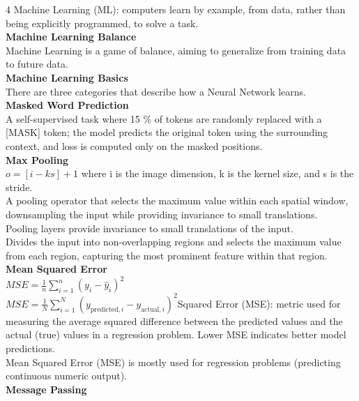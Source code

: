 \documentclass[8pt]{extarticle}
\begin{document}
\begin{multicols}{4}
Machine Learning (ML): computers learn by example, from data, rather than being explicitly programmed, to solve a task.\\
\vspace{2pt}\textbf{Machine Learning Balance}\\
Machine Learning is a game of balance, aiming to generalize from training data to future data.\\
\vspace{2pt}\textbf{Machine Learning Basics}\\
There are three categories that describe how a Neural Network learns.\\
\vspace{2pt}\textbf{Masked Word Prediction}\\
A self-supervised task where 15 \% of tokens are randomly replaced with a [MASK] token; the model predicts the original token using the surrounding context, and loss is computed only on the masked positions.\\
\vspace{2pt}\textbf{Max Pooling}\\
$o = \left[ i - k s \right] + 1$ where i is the image dimension, k is the kernel size, and s is the stride.\\
A pooling operator that selects the maximum value within each spatial window, downsampling the input while providing invariance to small translations.\\
Pooling layers provide invariance to small translations of the input.\\
Divides the input into non-overlapping regions and selects the maximum value from each region, capturing the most prominent feature within that region.\\
\vspace{2pt}\textbf{Mean Squared Error}\\
$MSE = \frac{1}{n} \sum_{i=1}^{n} (y_i - \hat{y}_i)^2$\\
$MSE = \frac{1}{N} \sum_{i=1}^{N} (y_{\text{predicted},i} - y_{\text{actual},i})^2$\Mean Squared Error (MSE): metric used for measuring the average squared difference between the predicted values and the actual (true) values in a regression problem. Lower MSE indicates better model predictions.\\
Mean Squared Error (MSE) is mostly used for regression problems (predicting continuous numeric output).\\
\vspace{2pt}\textbf{Message Passing}\\


\end{multicols}
\end{document}
